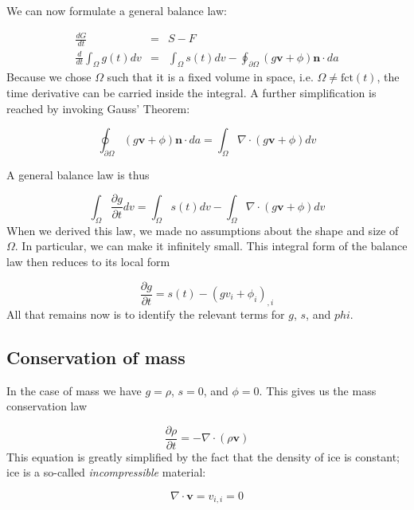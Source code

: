 \documentclass[12pt, openany]{memoir}
\newcommand{\pder}[2]{\ensuremath{\frac{\partial #1}{\partial #2}}}
\begin{document}
We can now formulate a general balance law:

\begin{eqnarray}
\frac{dG}{dt} &=& S - F \\
\frac{d}{dt} \int_\Omega g(t) dv &=& \int_\Omega s(t) dv -
\oint_{\partial \Omega} (g \mathbf{v} + \phi) \mathbf{n} \cdot da
\end{eqnarray}
Because we chose $\Omega$ such that it is a fixed volume in space,
i.e. $\Omega \ne \mathrm{fct}(t)$, the time derivative can be carried
inside the integral. A further simplification is reached by invoking
Gauss' Theorem: 

\begin{equation}
\oint_{\partial \Omega} (g \mathbf{v} + \phi) \mathbf{n} \cdot da =
\int_\Omega \nabla \cdot (g \mathbf{v} + \phi) dv
\end{equation}

A general balance law is thus

\begin{equation}
\int_\Omega \pder{g}{t} dv = \int_\Omega s(t) dv - \int_\Omega \nabla
\cdot (g \mathbf{v} + \phi) dv
\end{equation}
When we derived this law, we made no assumptions about the shape and
size of $\Omega$. In particular, we can make it infinitely small. This
integral form of the balance law then reduces to its local form

\begin{equation}
\pder{g}{t} = s(t) - (g v_i + \phi_i)_{,i} 
\end{equation}
All that remains now is to identify the relevant terms for $g$, $s$,
and $phi$.

\subsection{Conservation of mass}

In the case of mass we have $g = \rho$, $s = 0$, and $\phi = 0$. This
gives us the mass conservation law 

\begin{equation}
\pder{\rho}{t} = - \nabla \cdot (\rho \mathbf{v})
\end{equation}
This equation is greatly simplified by the fact that the density of
ice is constant; ice is a so-called \emph{incompressible} material:

\begin{equation} \label{eq:mass}
\nabla \cdot \mathbf{v} = v_{i,i} = 0
\end{equation}
\end{document}
